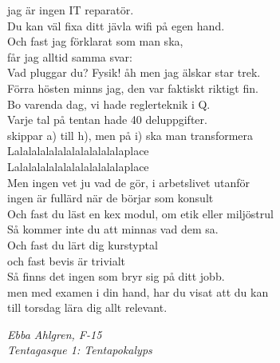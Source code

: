 \documentclass[a6paper,10pt]{article}
\begin{document}
jag är ingen IT reparatör.\\
Du kan väl fixa ditt jävla wifi på egen hand.\\
Och fast jag förklarat som man ska,\\
får jag alltid samma svar:\\
Vad pluggar du? Fysik! åh men jag älskar star trek.   
\vspace{5pt}\\
Förra hösten  minns jag, den var faktiskt riktigt fin.\\
Bo varenda dag, vi hade reglerteknik i Q.\\
Varje tal på tentan hade 40 deluppgifter.\\
skippar a) till h), men på i) ska man transformera
\vspace{5pt}\\
Lalalalalalalalalalalalalaplace\\
Lalalalalalalalalalalalalaplace
\vspace{5pt}\\
Men ingen vet ju vad de gör, i arbetslivet utanför\\
ingen är fullärd när de börjar som konsult\\
Och fast du läst en kex modul, om etik eller miljöstrul\\
Så kommer inte du att minnas vad dem sa.\\
Och fast du lärt dig kurstyptal\\
och fast bevis är trivialt\\    
Så finns det ingen som bryr sig på ditt jobb.\\
men med examen i din hand, har du visat att du kan\\
till torsdag lära dig allt relevant.

\begin{flushright}
\textit{Ebba Ahlgren, F-15\\ Tentagasque 1: Tentapokalyps}
\end{flushright}

\setlength{\oddsidemargin}{-0.47in}
\end{document}

